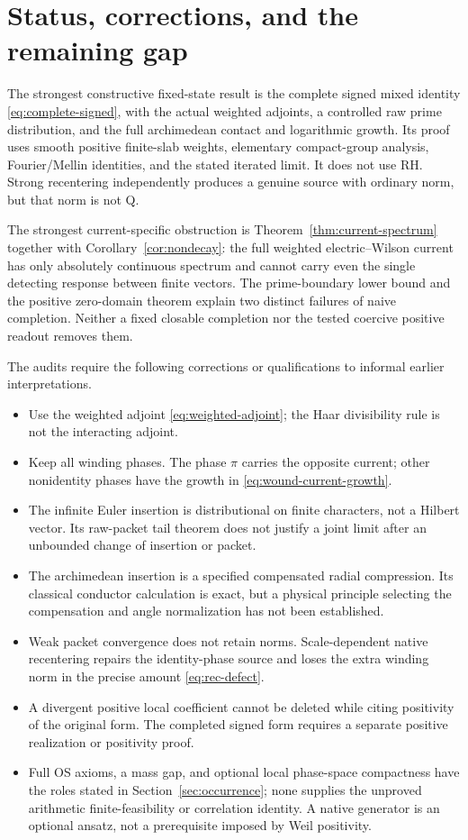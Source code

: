 \section{Status, corrections, and the remaining gap}\label{sec:status}
The strongest constructive fixed-state result is the
complete signed mixed identity \eqref{eq:complete-signed},
with the actual weighted adjoints, a controlled raw
prime distribution, and the full archimedean contact and
logarithmic growth. Its proof uses smooth positive
finite-slab weights, elementary compact-group analysis,
Fourier/Mellin identities, and the stated iterated limit.
It does not use RH. Strong recentering independently
produces a genuine source with ordinary \Ltwo{} norm, but
that norm is not Q.

The strongest current-specific obstruction is
Theorem~\ref{thm:current-spectrum} together with
Corollary~\ref{cor:nondecay}: the full weighted
electric--Wilson current has only absolutely continuous
spectrum and cannot carry even the single detecting
response between finite vectors. The prime-boundary
lower bound and the positive zero-domain theorem explain
two distinct failures of naive completion. Neither a
fixed closable \Ltwo{} completion nor the tested coercive
positive readout removes them.

The audits require the following corrections or
qualifications to informal earlier interpretations.
\begin{itemize}
\item Use the weighted adjoint
\eqref{eq:weighted-adjoint}; the Haar divisibility rule
is not the interacting adjoint.
\item Keep all winding phases. The phase $\pi$ carries
the opposite current; other nonidentity phases have
the growth in \eqref{eq:wound-current-growth}.
\item The infinite Euler insertion is distributional
on finite characters, not a Hilbert vector. Its
raw-packet tail theorem does not justify a joint limit
after an unbounded change of insertion or packet.
\item The archimedean insertion is a specified
compensated radial compression. Its classical
conductor calculation is exact, but a physical
principle selecting the compensation and angle
normalization has not been established.
\item Weak packet convergence does not retain norms.
Scale-dependent native recentering repairs the
identity-phase \Ltwo{} source and loses the extra winding
norm in the precise amount \eqref{eq:rec-defect}.
\item A divergent positive local coefficient cannot
be deleted while citing positivity of the original
form. The completed signed form requires a separate
positive realization or positivity proof.
\item Full OS axioms, a mass gap, and optional local
phase-space compactness have the roles stated in
Section~\ref{sec:occurrence}; none supplies the
unproved arithmetic finite-feasibility or correlation
identity. A native generator is an optional ansatz,
not a prerequisite imposed by Weil positivity.
\end{itemize}

